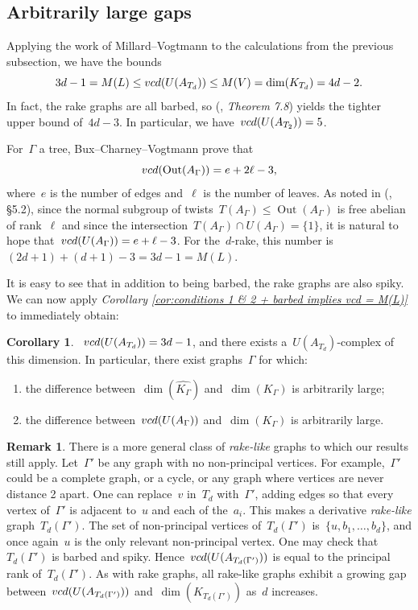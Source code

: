 \documentclass[11pt]{amsart}
\theoremstyle{definition}
\theoremstyle{definition}
\theoremstyle{definition}
\theoremstyle{definition}
\newtheorem{corollary}[theorem]{Corollary}
\newtheorem{remark}[theorem]{Remark}
\newcommand{\raag}{A_\Gamma} %
\newcommand{\uag}{U(A_{\Gamma})} %
\newcommand{\oag}{\operatorname{Out}(A_{\Gamma})} %
\newcommand{\vcduag}{\textsc{vcd}(U(A_{\Gamma}))} %
\newcommand{\spine}{K_{\Gamma}} %
\newcommand{\res}{\widehat{K_\Gamma}} %
\begin{document}
\subsection{Arbitrarily large gaps}\label{subsec:arbitrarily large gaps}

Applying the work of Millard--Vogtmann \cite{MillardVogtmannCubeComplexes21} to the calculations from the previous subsection, we have the bounds
\[3d-1 = M(L) \leq \textsc{vcd}(U(A_{T_d})) \leq M(V) = \dim(K_{T_d}) = 4d-2.\]
In fact, the rake graphs are all barbed, so (\cite{MillardVogtmannCubeComplexes21}, \textit{Theorem 7.8}) yields the tighter upper bound of~$4d-3$. In particular, we have~$\textsc{vcd}(U(A_{T_2})) = 5$. 

For~$\Gamma$ a tree, Bux--Charney--Vogtmann \cite{BuxCharneyVogtmann2dimRAAGs09} prove that 
\[\textsc{vcd}(\oag) = e + 2\ell - 3,\]
where~$e$ is the number of edges and~$\ell$ is the number of leaves. As noted in (\cite{CharneyStambaughVogtmannUntwistedOuterSpace17}, \S5.2), since the normal subgroup of twists~$T(\raag) \leq \oag$ is free abelian of rank~$\ell$ and since the intersection~$T(\raag) \cap \uag = \{1\}$, it is natural to hope that~$\vcduag = e + \ell - 3$. For the~$d$-rake, this number is~$(2d+1) + (d+1) - 3 = 3d-1 = M(L)$. 

It is easy to see that in addition to being barbed, the rake graphs are also spiky. We can now apply \emph{Corollary \ref{cor:conditions 1 & 2 + barbed implies vcd = M(L)}} to immediately obtain:

\begin{corollary}\label{cor:arbitrarily large gaps}
   ~$\textsc{vcd}(U(A_{T_d})) = 3d-1$, and there exists a~$U(A_{T_d})$-complex of this dimension. In particular, there exist graphs~$\Gamma$ for which:
    \begin{enumerate}
        \item the difference between~$\dim(\res)$ and~$\dim(\spine)$ is arbitrarily large;
        \item the difference between~$\vcduag$ and~$\dim(\spine)$ is arbitrarily large.
    \end{enumerate}
\end{corollary}

\begin{remark}\label{rem:rake derivatives}
    There is a more general class of \emph{rake-like} graphs to which our results still apply. Let~$\Gamma'$ be any graph with no non-principal vertices. For example,~$\Gamma'$ could be a complete graph, or a cycle, or any graph where vertices are never distance 2 apart. One can replace~$v$ in~$T_d$ with~$\Gamma'$, adding edges so that every vertex of~$\Gamma'$ is adjacent to~$u$ and each of the~$a_i$. This makes a derivative \emph{rake-like} graph~$T_d(\Gamma')$. The set of non-principal vertices of~$T_d(\Gamma')$ is~$\{u, b_1, \dots, b_d\}$, and once again~$u$ is the only relevant non-principal vertex. One may check that~$T_d(\Gamma')$ is barbed and spiky. Hence~$\textsc{vcd}(U(A_{T_d(\Gamma')}))$ is equal to the principal rank of~$T_d(\Gamma')$. As with rake graphs, all rake-like graphs exhibit a growing gap between~$\textsc{vcd}(U(A_{T_d(\Gamma')}))$ and~$\dim(K_{T_d(\Gamma')})$ as~$d$ increases.
\end{remark}
\end{document}
